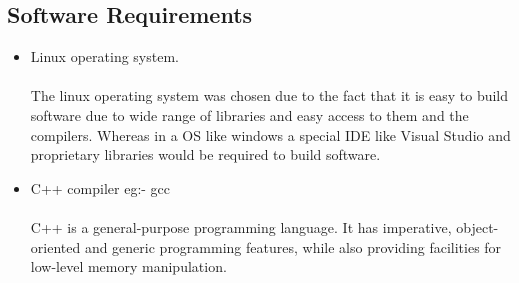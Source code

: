 \documentclass[11pt]{report}
\begin{document}
\subsection{Software Requirements}
\begin{itemize}
    \item Linux operating system.
    \\
    \\The linux operating system was chosen due to the fact that it is easy to build software due to wide range of libraries and easy access to them and the compilers. Whereas in a OS like windows a special IDE like Visual Studio and proprietary libraries would be required to build software.
    \item C++ compiler eg:- gcc
    \\
    \\C++ is a general-purpose programming language. It has imperative, object-oriented and generic programming features, while also providing facilities for low-level memory manipulation.


\end{itemize}
\end{document}
